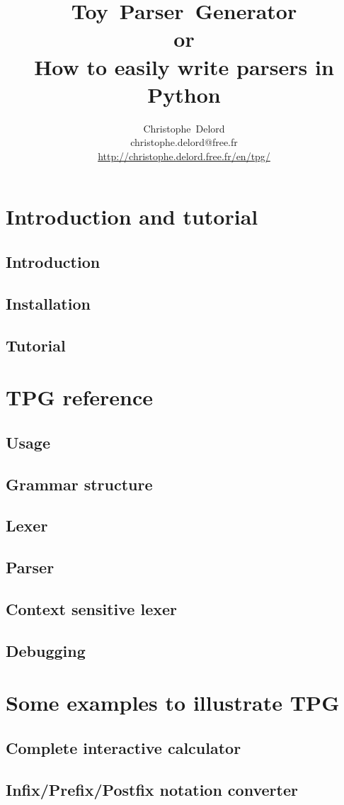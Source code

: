 \documentclass[a4paper,twoside]{report}
\author{
    Christophe~Delord\\
    christophe.delord@free.fr \\
    \url{http://christophe.delord.free.fr/en/tpg/} \\
}
\title{
    Toy~Parser~Generator \\
    or\\
    How to easily write parsers in Python \\
}
\begin{document}
\maketitle
\tableofcontents

\listoffigures

\cleardoublepage
\part{Introduction and tutorial}                            \label{tpg:intro}
    \chapter{Introduction}
        
    \chapter{Installation}
        
    \chapter{Tutorial}                                      \label{tpg:tutorial}
        

\cleardoublepage
\part{TPG reference}                                        \label{tpg:core}
    \chapter{Usage}
        
    \chapter{Grammar structure}
        
    \chapter{Lexer}
        
    \chapter{Parser}
        
    \chapter{Context sensitive lexer}                       \label{tpg:CSL}
        
    \chapter{Debugging}
        

\cleardoublepage
\part{Some examples to illustrate TPG}                      \label{tpg:examples}
    \chapter{Complete interactive calculator}
        
    \chapter{Infix/Prefix/Postfix notation converter}
        
\end{document}
